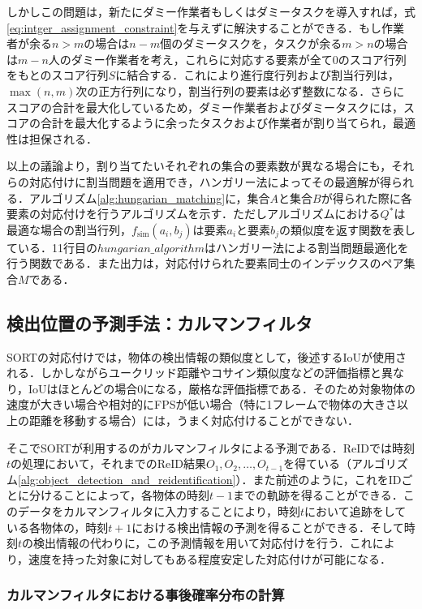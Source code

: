     しかしこの問題は，新たにダミー作業者もしくはダミータスクを導入すれば，式\ref{eq:intger_assignment_constraint}を与えずに解決することができる．もし作業者が余る$n > m$の場合は$n-m$個のダミータスクを，タスクが余る$m > n$の場合は$m-n$人のダミー作業者を考え，これらに対応する要素が全て$0$のスコア行列をもとのスコア行列$S$に結合する．これにより進行度行列および割当行列は，$\max(n, m)$次の正方行列になり，割当行列の要素は必ず整数になる．さらにスコアの合計を最大化しているため，ダミー作業者およびダミータスクには，スコアの合計を最大化するように余ったタスクおよび作業者が割り当てられ，最適性は担保される．

    以上の議論より，割り当てたいそれぞれの集合の要素数が異なる場合にも，それらの対応付けに割当問題を適用でき，ハンガリー法によってその最適解が得られる．アルゴリズム\ref{alg:hungarian_matching}に，集合$A$と集合$B$が得られた際に各要素の対応付けを行うアルゴリズムを示す．ただしアルゴリズムにおける$Q^*$は最適な場合の割当行列，$f_{\text{sim}}(a_i, b_j)$は要素$a_i$と要素$b_j$の類似度を返す関数を表している．11行目の$hungarian\_algorithm$はハンガリー法による割当問題最適化を行う関数である．また出力は，対応付けられた要素同士のインデックスのペア集合$M$である．

    \subsection{検出位置の予測手法：カルマンフィルタ}
    \label{subsec:kalman_filter}

    SORT\cite{bewley2016simple}の対応付けでは，物体の検出情報の類似度として，後述するIoUが使用される．しかしながらユークリッド距離やコサイン類似度などの評価指標と異なり，IoUはほとんどの場合$0$になる，厳格な評価指標である．そのため対象物体の速度が大きい場合や相対的にFPSが低い場合（特に1フレームで物体の大きさ以上の距離を移動する場合）には，うまく対応付けることができない．

    そこでSORTが利用するのがカルマンフィルタによる予測である．ReIDでは時刻$t$の処理において，それまでのReID結果$O_1, O_2, \dots, O_{t-1}$を得ている（アルゴリズム\ref{alg:object_detection_and_reidentification}）．また前述のように，これをIDごとに分けることによって，各物体の時刻$t-1$までの軌跡を得ることができる．このデータをカルマンフィルタに入力することにより，時刻$t$において追跡をしている各物体の，時刻$t+1$における検出情報の予測を得ることができる．そして時刻$t$の検出情報の代わりに，この予測情報を用いて対応付けを行う．これにより，速度を持った対象に対してもある程度安定した対応付けが可能になる．

        \subsubsection{カルマンフィルタにおける事後確率分布の計算}
        \label{subsubsec:kalmanfilter_setting}

